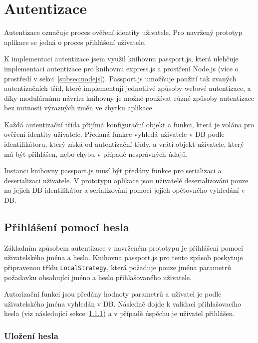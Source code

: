 
\section{Autentizace}\label{sec:autentizace}

Autentizace označuje proces ověření identity uživatele.
Pro navržený prototyp aplikace se jedná o proces přihlášení uživatele.

K implementaci autentizace jsem využil knihovnu passport.js, která ulehčuje implementaci autentizace pro knihovnu express.js a prostření Node.js (více o prostředí v sekci~\ref{subsec:nodejs}).
Passport.js umožňuje použití tak zvaných autentizačních tříd, které implementují jednotlivé způsoby webové autentizace, a díky modulárnímu návrhu knihovny je možné používat různé způsoby autentizace bez nutnosti výrazných změn ve zbytku aplikace.

Každá autentizační třída přijímá konfigurační objekt a funkci, která je volána pro ověření identity uživatele.
Předaná funkce vyhledá uživatele v DB podle identifikátoru, který získá od autentizační třídy, a vrátí objekt uživatele, který má být přihlášen, nebo chybu v případě nesprávných údajů.

Instanci knihovny passport.js musí být předány funkce pro serializaci a deserializaci uživatele.
V prototypu aplikace jsou uživatelé deserializováni pouze na jejich DB identifikátor a serializováni pomocí jejich opětovného vyhledání v DB.

\subsection{Přihlášení pomocí hesla}\label{subsec:přihlášeníPomocíHesla}

Základním způsobem autentizace v navrženém prototypu je přihlášení pomocí uživatelského jména a hesla.
Knihovna passport.js pro tento způsob poskytuje připravenou třídu \texttt{LocalStrategy}, která požaduje pouze jména parametrů požadavku obsahující jméno a heslo přihlašovaného uživatele.

Autorizační funkci jsou předány hodnoty parametrů a uživatel je podle uživatelského jména vyhledán v DB.
Následně dojde k validaci přihlašovacího hesla (viz následující sekce~\ref{subsubsec:uloženíHesla}) a v případě úspěchu je uživatel přihlášen.

\subsubsection{Uložení hesla}\label{subsubsec:uloženíHesla}

